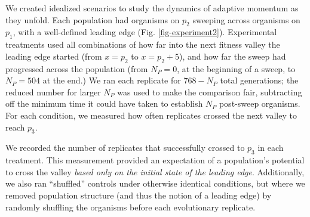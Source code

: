 We created idealized scenarios to study the dynamics of adaptive momentum as they unfold.
Each population had organisms on $p_{2}$ sweeping across organisms on $p_{1}$, with a well-defined leading edge (Fig. \ref{fig-experiment2}).
Experimental treatments used all combinations of how far into the next fitness valley the leading edge started (from $x=p_{2}$ to $x=p_{2}+5$), and how far the sweep had progressed across the population (from $N_P=0$, at the beginning of a sweep, to $N_P=504$ at the end.)
We ran each replicate for $768-N_P$ total generations; the reduced number for larger $N_P$ was used to make the comparison fair, subtracting off the minimum time it could have taken to establish $N_P$ post-sweep organisms.
For each condition, we measured how often replicates crossed the next valley to reach $p_{3}$.

We recorded the number of replicates that successfully crossed to $p_{3}$ in each treatment. 
This measurement provided an expectation of a population's potential to cross the valley \textit{based only on the initial state of the leading edge}.
Additionally, we also ran ``shuffled'' controls under otherwise identical conditions, but where we removed population structure (and thus the notion of a leading edge) by randomly shuffling the organisms before each evolutionary replicate.

